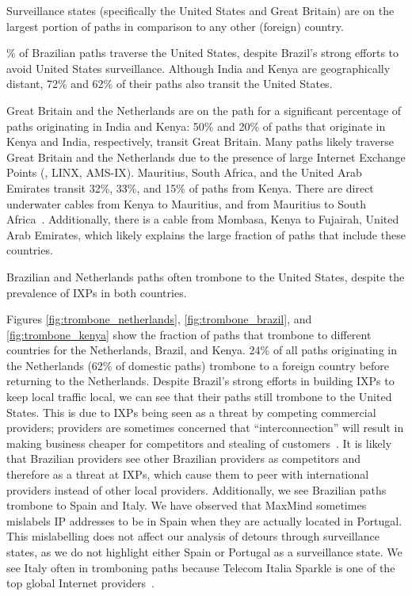 \begin{finding}
Surveillance states (specifically the United States and Great Britain) are on the largest portion of paths in comparison to any other (foreign) country.
\end{finding}
\% of Brazilian paths traverse the United States, despite Brazil's
strong efforts to avoid United States surveillance.  Although India and
Kenya are geographically distant, 72\% and 62\% of their paths also transit
the United States.

Great Britain and the Netherlands are on the path for a significant
percentage of paths originating in India and Kenya: 50\% and 20\% of
paths that originate in Kenya and India, respectively, transit Great
Britain.   Many paths likely traverse Great Britain and the Netherlands due to
the presence of large Internet Exchange Points (\ie, LINX, AMS-IX).
Mauritius, South Africa, and the United Arab Emirates transit 32\%,
33\%, and 15\% of paths from Kenya.  There are direct underwater cables
from Kenya to Mauritius, and from Mauritius to South
Africa~\cite{cablemap}.  Additionally, there is a cable from Mombasa,
Kenya to Fujairah, United Arab Emirates, which likely explains the large
fraction of paths that include these countries. 



\begin{finding}
Brazilian and Netherlands paths often trombone to the United States, despite the prevalence of IXPs in both countries.
\end{finding}
\noindent
Figures \ref{fig:trombone_netherlands}, \ref{fig:trombone_brazil}, and \ref{fig:trombone_kenya} show the fraction of paths that trombone to different countries for the Netherlands, Brazil, and Kenya. 24\% of all paths originating in the Netherlands (62\% of domestic paths) trombone to a foreign country before returning to the Netherlands. Despite Brazil's strong efforts in building IXPs to keep local traffic local, we can see that their paths still trombone to the United States.  This is due to IXPs being seen as a threat by competing commercial providers; providers are sometimes concerned that ``interconnection'' will result in making business cheaper for competitors and stealing of customers~\cite{ixp_policy}.  It is likely that Brazilian providers see other Brazilian providers as competitors and therefore as a threat at IXPs, which cause them to peer with international providers instead of other local providers.  Additionally, we see Brazilian paths trombone to Spain and Italy. We have observed that MaxMind sometimes mislabels IP addresses to be in Spain when they are actually located in Portugal.  This mislabelling does not affect our analysis of detours through surveillance states, as we do not highlight either Spain or Portugal as a surveillance state.  We see Italy often in tromboning paths because Telecom Italia Sparkle is one of the top global Internet providers~\cite{bakers}.

